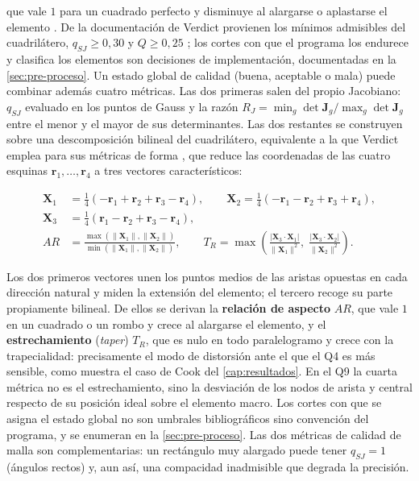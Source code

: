 que vale $1$ para un cuadrado perfecto y disminuye al alargarse o aplastarse el elemento \autocite[p.~57]{stimpson2007verdict}. De la documentación de Verdict provienen los mínimos admisibles del cuadrilátero, $q_{SJ} \ge 0{,}30$ y $Q \ge 0{,}25$ \autocite[pp.~51, 57]{stimpson2007verdict}; los cortes con que el programa los endurece y clasifica los elementos son decisiones de implementación, documentadas en la \autoref{sec:pre-proceso}. Un estado global de calidad (buena, aceptable o mala) puede combinar además cuatro métricas. Las dos primeras salen del propio Jacobiano: $q_{SJ}$ evaluado en los puntos de Gauss y la razón $R_J = \min_g \det\bm{J}_g / \max_g \det\bm{J}_g$ entre el menor y el mayor de sus determinantes. Las dos restantes se construyen sobre una descomposición bilineal del cuadrilátero, equivalente a la que Verdict emplea para sus métricas de forma \autocite[pp.~35-36]{stimpson2007verdict}, que reduce las coordenadas de las cuatro esquinas $\bm{r}_1,\dots,\bm{r}_4$ a tres vectores característicos:

\begin{equation}
\begin{aligned}
\bm{X}_1 &= \tfrac{1}{4}\left(-\bm{r}_1 + \bm{r}_2 + \bm{r}_3 - \bm{r}_4\right), \qquad
\bm{X}_2 = \tfrac{1}{4}\left(-\bm{r}_1 - \bm{r}_2 + \bm{r}_3 + \bm{r}_4\right), \\[2pt]
\bm{X}_3 &= \tfrac{1}{4}\left(\bm{r}_1 - \bm{r}_2 + \bm{r}_3 - \bm{r}_4\right), \\[4pt]
AR &= \frac{\max(\|\bm{X}_1\|, \|\bm{X}_2\|)}{\min(\|\bm{X}_1\|, \|\bm{X}_2\|)}, \qquad
T_R = \max\left(\frac{|\bm{X}_3 \cdot \bm{X}_1|}{\|\bm{X}_1\|^2},\; \frac{|\bm{X}_3 \cdot \bm{X}_2|}{\|\bm{X}_2\|^2}\right).
\end{aligned}
\label{eq:descomposicion-bilineal}
\end{equation}

Los dos primeros vectores unen los puntos medios de las aristas opuestas en cada dirección natural y miden la extensión del elemento; el tercero recoge su parte propiamente bilineal. De ellos se derivan la \textbf{relación de aspecto} $AR$, que vale $1$ en un cuadrado o un rombo y crece al alargarse el elemento, y el \textbf{estrechamiento} (\emph{taper}) $T_R$, que es nulo en todo paralelogramo y crece con la trapecialidad: precisamente el modo de distorsión ante el que el Q4 es más sensible, como muestra el caso de Cook del \autoref{cap:resultados}. En el Q9 la cuarta métrica no es el estrechamiento, sino la desviación de los nodos de arista y central respecto de su posición ideal sobre el elemento macro. Los cortes con que se asigna el estado global no son umbrales bibliográficos sino convención del programa, y se enumeran en la \autoref{sec:pre-proceso}. Las dos métricas de calidad de malla son complementarias: un rectángulo muy alargado puede tener $q_{SJ} = 1$ (ángulos rectos) y, aun así, una compacidad inadmisible que degrada la precisión.

